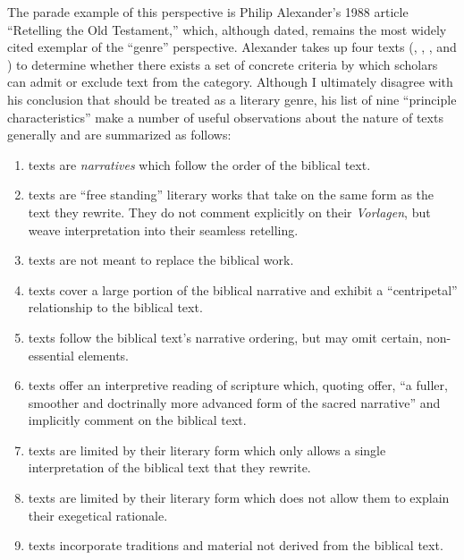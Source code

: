  The parade example of this perspective is Philip Alexander's 1988 article ``Retelling the Old Testament,'' which, although dated, remains the most widely cited exemplar of the ``genre'' perspective.\autocites{alexander_carson-williamson1988}[\vermes himself even put his stamp of approval on it, see][4]{vermes_zsengeller2014} Alexander takes up four \rwB texts (\jub, \ga, \lab, and \ant) to determine whether there exists a set of concrete criteria by which scholars can admit or exclude text from the category. Although I ultimately disagree with his conclusion that \rwb should be treated as a literary genre, his list of nine ``principle characteristics'' make a number of useful observations about the nature of \rwb texts generally and are summarized as follows: 

 \begin{enumerate} \def\labelenumi{\arabic{enumi}.} \tightlist \item   \rwb texts are \emph{narratives} which follow the   order of the biblical text. \item   \rwb texts are ``free standing'' literary works that   take on the same form as the text they rewrite. They do not comment   explicitly on their \emph{Vorlagen}, but weave interpretation into   their seamless retelling. \item   \rwb texts are not meant to replace the biblical work. \item   \rwb texts cover a large portion of the biblical   narrative and exhibit a ``centripetal'' relationship to the biblical   text. \item   \rwb texts follow the biblical text's narrative   ordering, but may omit certain, non-essential elements. \item   \rwb texts offer an interpretive reading of scripture   which, quoting \vermes offer, ``a fuller, smoother and   doctrinally more advanced form of the sacred   narrative''\autocite[Citing \vermes   in][305]{schurer1986} and implicitly comment on the biblical text. \item   \rwb texts are limited by their literary form which   only allows a single interpretation of the biblical text that they   rewrite. \item   \rwb texts are limited by their literary form which   does not allow them to explain their exegetical rationale. \item   \rwb texts incorporate traditions and material not   derived from the biblical text. \end{enumerate} 

